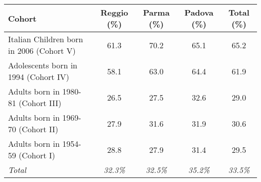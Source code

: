 \begin{tabular}{ l c c c c }
\toprule
\textbf{Cohort} & \textbf{Reggio (\%)} & \textbf{Parma (\%)} & \textbf{Padova (\%)} & \textbf{Total (\%)}\\
\midrule
Italian Children born in 2006 (Cohort V)   & 61.3  & 70.2  & 65.1  & 65.2 \\[0.2em]
Adolescents born in 1994 (Cohort IV)       & 58.1  & 63.0  & 64.4  & 61.9 \\[0.2em]
Adults born in 1980-81 (Cohort III)        & 26.5  & 27.5  & 32.6  & 29.0 \\[0.2em]
Adults born in 1969-70 (Cohort II)         & 27.9  & 31.6  & 31.9  & 30.6 \\[0.2em]
Adults born in 1954-59 (Cohort I)          & 28.8  & 27.9  & 31.4  & 29.5 \\[0.2em]
\midrule
\textit{Total}         & \textit{32.3\%}  & \textit{32.5\%}  & \textit{35.2\%} & \textit{33.5\%} \\
\bottomrule
\end{tabular}

